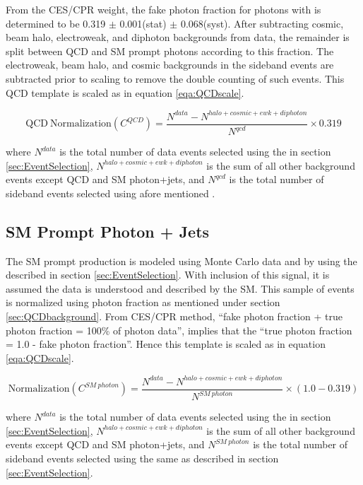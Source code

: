 \documentclass[11pt]{article}
\begin{document}
\noindent From the CES/CPR weight, the fake photon fraction for photons with  is determined to be 0.319 $\pm$ 0.001(stat) $\pm$ 0.068(syst). After subtracting cosmic, beam halo, electroweak, and diphoton backgrounds from data, the remainder is split between QCD and SM prompt photons according to this fraction. The electroweak, beam halo, and cosmic backgrounds in the sideband events are subtracted prior to scaling to remove the double counting of such events. This QCD template is scaled as in equation \ref{eqa:QCDscale}.

\begin{equation}
\mathrm{QCD~Normalization}(C^{QCD}) = \frac{N^{data}-N^{halo+cosmic+ewk+diphoton}}{N^{qcd}}\times 0.319
\label{eqa:QCDscale}
\end{equation}

\noindent where $N^{data}$ is the total number of data events selected using the  in section \ref{sec:EventSelection},   $N^{halo+cosmic+ewk+diphoton}$ is the sum of all other background events except QCD and SM photon+jets, and $N^{qcd}$  is the total number of sideband events selected using afore mentioned .


\subsection{SM Prompt Photon + Jets}\label{sec:SMpromptPhotonJets}
The SM prompt \phojets production is modeled using Monte Carlo data and by using the  described in section \ref{sec:EventSelection}. With inclusion of this signal, it is assumed the data is understood and described by the SM. This sample of events is normalized using photon fraction as mentioned under section \ref{sec:QCDbackground}. From CES/CPR method, ``fake photon fraction + true photon fraction = 100\% of photon data'', implies that the ``true photon fraction = 1.0 - fake photon fraction''. Hence this template is scaled as in equation \ref{eqa:QCDscale}.

\begin{equation}
\mathrm{Normalization} (C^{SM~photon}) = \frac{N^{data}-N^{halo+cosmic+ewk+diphoton}}{N^{SM~photon}}\times(1.0- 0.319)
\label{eqa:SMpromptScale}
\end{equation}

\noindent where $N^{data}$ is the total number of data events selected using the  in section \ref{sec:EventSelection},   $N^{halo+cosmic+ewk+diphoton}$ is the sum of all other background events except QCD and SM photon+jets, and $N^{SM~photon}$ is the total number of sideband events selected using the same  as described in section \ref{sec:EventSelection}.
\end{document}
